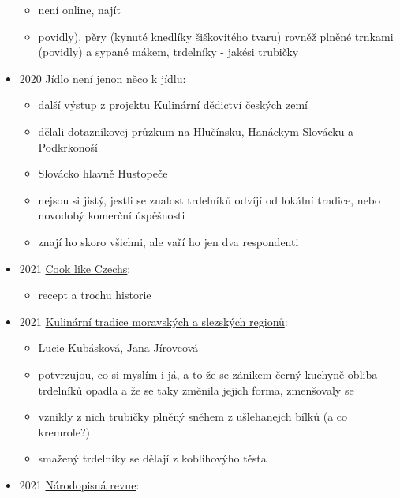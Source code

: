 \begin{itemize}
  \begin{itemize}
  \tightlist
  \item
    není online, najít
  \item
    povidly), pěry (kynuté knedlíky šiškovitého tvaru) rovněž plněné
    trnkami (povidly) a sypané mákem, trdelníky - jakési trubičky
  \end{itemize}
\item
  2020
  \href{https://kulturni-dejiny.slu.cz/data/uploads/067/upvysledky/jidlo-neni-jenom_odborna-kniha_uplatnny_2020.pdf}{Jídlo
  není jenon něco k jídlu}:

  \begin{itemize}
  \tightlist
  \item
    další výstup z projektu Kulinární dědictví českých zemí
  \item
    dělali dotazníkovej průzkum na Hlučínsku, Hanáckym Slovácku a
    Podkrkonoší
  \item
    Slovácko hlavně Hustopeče
  \item
    nejsou si jistý, jestli se znalost trdelníků odvíjí od lokální
    tradice, nebo novodobý komerční úspěšnosti
  \item
    znají ho skoro všichni, ale vaří ho jen dva respondenti
  \end{itemize}
\item
  2021 \href{https://www.cooklikeczechs.com/trdelnik/}{Cook like
  Czechs}:

  \begin{itemize}
  \tightlist
  \item
    recept a trochu historie
  \end{itemize}
\item
  2021
  \href{https://www.nzm.cz/o-nas/veda-a-vyzkum/publikacni-cinnost/odborne-publikace/kulinarni-tradice-moravskych-a-slezskych-regionu}{Kulinární
  tradice moravských a slezských regionů}:

  \begin{itemize}
  \tightlist
  \item
    Lucie Kubásková, Jana Jírovcová
  \item
    potvrzujou, co si myslím i já, a to že se zánikem černý kuchyně
    obliba trdelníků opadla a že se taky změnila jejich forma,
    zmenšovaly se
  \item
    vznikly z nich trubičky plněný sněhem z ušlehanejch bílků (a co
    kremrole?)
  \item
    smažený trdelníky se dělají z koblihovýho těsta
  \end{itemize}
\item
  2021
  \href{https://revue.nulk.cz/wp-content/uploads/2022/01/r4-2021-1.pdf\#page=16}{Národopisná
  revue}:


\end{itemize}
